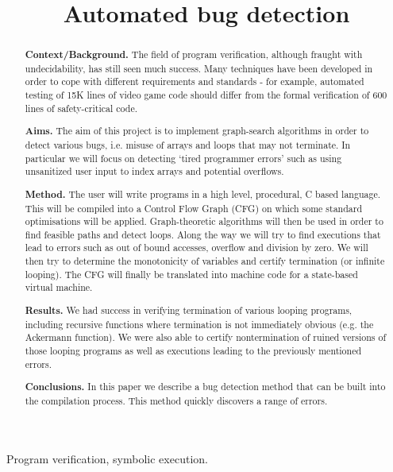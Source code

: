 \documentclass[12pt,a4paper]{article}
\title{Automated bug detection}
\author{} %
\date{}
\begin{document}
\maketitle

\begin{abstract}
\par
\noindent
{\bf Context/Background.} The field of program verification, although fraught with undecidability, has still seen much success. Many techniques have been developed in order to
cope with different requirements and standards - for example, automated testing of 15K lines of video game code should differ from the formal verification of 600 lines
of safety-critical code.
\noindent
\par
\noindent
{\bf Aims.} The aim of this project is to implement graph-search algorithms in order to detect various bugs, i.e. misuse of arrays and loops that may not terminate. In particular we will focus on detecting `tired programmer errors' such as using unsanitized user input to index arrays and potential overflows.
\noindent
\par
\noindent
{\bf Method.} The user will write programs in a high level, procedural, C based language. This will be compiled into a Control Flow Graph (CFG) on which some standard
optimisations will be applied. Graph-theoretic algorithms will then be used in order to find feasible paths and detect loops. Along the way we will try to find executions
that lead to errors such as out of bound accesses, overflow and division by zero.
We will then try to determine the monotonicity of variables and certify termination (or 
infinite looping). The CFG will finally be translated into machine code for a state-based virtual machine.
\noindent
\par
\noindent
{\bf Results.} We had success in verifying termination of various looping programs, including recursive functions where termination is not immediately obvious (e.g. the Ackermann function). We were also able to certify nontermination of ruined versions of those looping programs as well as executions leading to the previously mentioned errors.
\noindent
\par
\noindent
{\bf Conclusions.} In this paper we describe a bug detection method that can be built into the compilation process. This method quickly discovers a range of errors.
\end{abstract}

\begin{keywords}
Program verification, symbolic execution.
\end{keywords}
\end{document}
